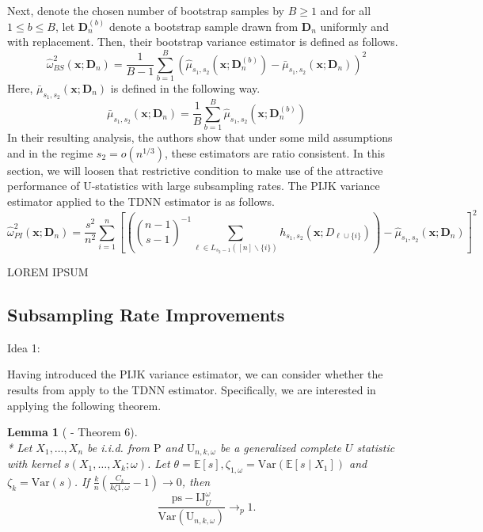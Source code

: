 \documentclass[letterpaper,10pt]{article}
\numberwithin{equation}{section}
\numberwithin{thm}{section}
\newtheorem{lem}{Lemma}
\numberwithin{lem}{section}
\numberwithin{cor}{section}
\renewcommand{\hat}{\widehat}
\newcommand{\E}{\mathbb{E}}
\newcommand{\1}{\mathbbm{1}}
\newcommand{\Var}{\text{Var}}
\begin{document}
Next, denote the chosen number of bootstrap samples by $B \geq 1$ and for all $1 \leq b \leq B$, let $\mathbf{D}^{(b)}_n$ denote a bootstrap sample drawn from $\mathbf{D}_n$ uniformly and with replacement.
Then, their bootstrap variance estimator is defined as follows.
\begin{equation}
	\hat{\omega}_{BS}^2\left(\mathbf{x}; \mathbf{D}_n\right)
	= \frac{1}{B - 1}\sum_{b = 1}^{B} \left(\hat{\mu}_{s_1, s_2}\left(\mathbf{x}; \mathbf{D}_{n}^{(b)}\right) - \bar{\mu}_{s_1, s_2}\left(\mathbf{x}; \mathbf{D}_{n}\right)\right)^2
\end{equation}
Here, $\bar{\mu}_{s_1, s_2}\left(\mathbf{x}; \mathbf{D}_{n}\right)$ is defined in the following way.
\begin{equation}
	\bar{\mu}_{s_1, s_2}\left(\mathbf{x}; \mathbf{D}_{n}\right)
	= \frac{1}{B} \sum_{b = 1}^{B} \hat{\mu}_{s_1, s_2}\left(\mathbf{x}; \mathbf{D}_{n}^{(b)}\right)
\end{equation}
In their resulting analysis, the authors show that under some mild assumptions and in the regime $s_2 = o(n^{1/3})$, these estimators are ratio consistent.
In this section, we will loosen that restrictive condition to make use of the attractive performance of U-statistics with large subsampling rates.
The PIJK variance estimator applied to the TDNN estimator is as follows.
\begin{equation}
	\hat{\omega}_{PI}^2\left(\mathbf{x}; \mathbf{D}_n\right)
	= \frac{s^2}{n^2}\sum_{i = 1}^{n}\left[\left(
		\binom{n-1}{s-1}^{-1} \sum_{\ell \in L_{s_2-1}([n]\backslash\{i\})} h_{s_1, s_2}\left(\mathbf{x}; D_{\ell \cup \{i\}}\right)\right)
		- \hat{\mu}_{s_1, s_2}\left(\mathbf{x}; \mathbf{D}_n\right)\right]^2
\end{equation}

{\color{red} LOREM IPSUM}

\subsection{Subsampling Rate Improvements}

{\color{red} Idea 1:}

Having introduced the PIJK variance estimator, we can consider whether the results from \citet{peng_bias_2021} apply to the TDNN estimator.
Specifically, we are interested in applying the following theorem.

\begin{lem}[\citet{peng_bias_2021} - Theorem 6]\mbox{}\\*
	Let $X_1, \ldots, X_n$ be i.i.d. from $\mathrm{P}$ and $\mathrm{U}_{n, k, \omega}$ be a generalized complete $U$ statistic with kernel $s\left(X_1, \ldots, X_k ; \omega\right)$.
	Let $\theta=\E[s], \zeta_{1, \omega}=\Var\left(\E\left[s \mid X_1\right]\right)$ and $\zeta_k=\Var(s)$.
	If $\frac{k}{n}\left(\frac{C_k}{k \zeta 1, \omega}-1\right) \rightarrow 0$, then
	\begin{equation}
		\frac{\mathrm{ps-IJ}_{U}^\omega}{\Var\left(\mathrm{U}_{n, k, \omega}\right)}
		\longrightarrow_{p} 1 .
	\end{equation}
\end{lem}
\end{document}
